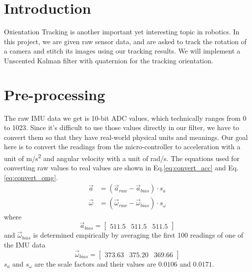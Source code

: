 \documentclass[twoside]{article}
\begin{document}
\begin{multicols}{2} %

\section{Introduction}
\lettrine[nindent=0em,lines=2]{O}rientation Tracking is another important yet interesting topic in robotics. In this project, we are given raw sensor data, and are asked to track the rotation of a camera and stitch its images using our tracking results. We will implement a Unscented Kalman filter with quaternion for the tracking orientation.


\section{Pre-processing}
The raw IMU data we get is 10-bit ADC values, which technically ranges from 0 to 1023. Since it's difficult to use those values directly in our filter, we have to convert them so that they have real-world physical units and meanings. Our goal here is to convert the readings from the micro-controller to acceleration with a unit of \si{m/s^2} and angular velocity with a unit of \si{\radian/s}.
The equations used for converting raw values to real values are shown in Eq.\ref{eq:convert_acc} and Eq.\ref{eq:convert_omg}.
\begin{align}
\label{eq:convert_acc}
\vec{a} &= (\vec{a}_{raw} - \vec{a}_{bias}) \cdot s_{a}\\
\vec{\omega} &= (\vec{\omega}_{raw} - \vec{\omega}_{bias}) \cdot s_{\omega}
\label{eq:convert_omg}
\end{align}
where 
\begin{equation}
\vec{a}_{bias} = \begin{bmatrix}511.5 & 511.5 & 511.5\end{bmatrix}
\end{equation}
and $\vec{\omega}_{bias}$ is determined empirically by averaging the first 100 readings of one of the IMU data
\begin{equation}
\vec{\omega}_{bias} = \begin{bmatrix}373.63 & 375.20 & 369.66\end{bmatrix}
\end{equation}
$s_{a}$ and $s_{\omega}$ are the scale factors and their values are $0.0106$ and $0.0171$.


\end{multicols}
\end{document}
